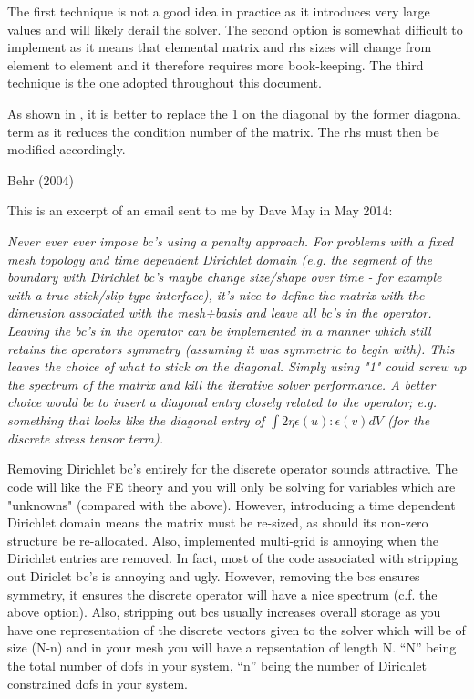 The first technique is not a good idea in practice as it introduces very large 
values and will likely derail the solver. The second option is somewhat difficult
to implement as it means that elemental matrix and rhs sizes will change from 
element to element and it therefore requires more book-keeping.
The third technique is the one adopted throughout this document. 

As shown in \cite{wuxl08}, it is better to replace the 1 on the diagonal 
by the former diagonal term as it reduces the condition number of the matrix. 
The rhs must then be modified accordingly.

\Literature Behr (2004) \cite{behr04}

 This is an excerpt of an email sent to me by Dave May in May 2014: 
{\it 
Never ever ever impose bc's using a penalty approach.
For problems with a fixed mesh topology and time dependent Dirichlet domain (e.g. the segment 
of the boundary with Dirichlet bc's 
maybe change size/shape over time - for example with a true stick/slip type interface), it's nice to define the matrix 
with the dimension associated with the mesh+basis and leave all bc's in the operator. 
Leaving the bc's in the operator can be implemented in a manner which still retains the operators symmetry (assuming 
it was symmetric to begin with). This leaves the choice of what to stick on the diagonal. Simply using "1" could 
screw up the spectrum of the matrix and kill the iterative solver performance. A better choice would be to insert 
a diagonal entry closely related to the operator; e.g. something that looks like the diagonal entry 
of $\int 2 \eta \epsilon(u) : \epsilon(v) dV$ (for the discrete stress tensor term). 

Removing Dirichlet bc's entirely for the discrete operator sounds attractive. The code will like the FE theory 
and you will only be solving for variables which are "unknowns" (compared with the above). 
However, introducing a time dependent Dirichlet domain means the matrix must be re-sized, as should its non-zero structure 
be re-allocated. Also, implemented multi-grid is annoying when the Dirichlet entries are removed. In fact, most of  
the code associated with stripping out Diriclet bc's is annoying and ugly. However, removing the bcs ensures symmetry, 
it ensures the discrete operator will have a nice spectrum (c.f. the above option). Also, stripping out bcs usually 
increases overall storage as you have one representation of the discrete vectors given to the solver which will be  
of size (N-n) and in your mesh you will have a repsentation of length N. ``N'' being the total number of dofs in your 
system, ``n'' being the number of Dirichlet constrained dofs in your system. }
 

